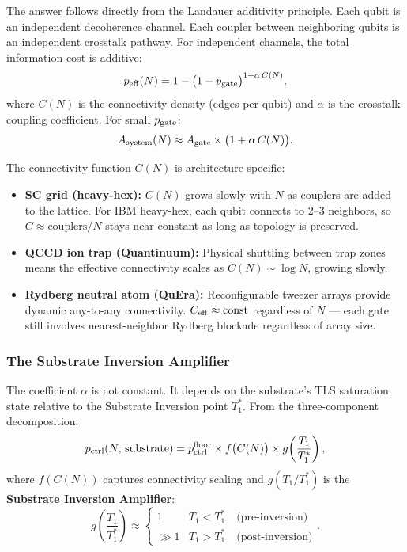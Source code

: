 \documentclass[12pt,a4paper]{article}
\begin{document}
The answer follows directly from the Landauer additivity principle. Each qubit
is an independent decoherence channel. Each coupler between neighboring qubits
is an independent crosstalk pathway. For independent channels, the total
information cost is additive:
\begin{equation}
p_{\rm eff}(N) = 1 - \bigl(1 - p_{\rm gate}\bigr)^{1 + \alpha\, C(N)},
\end{equation}
where $C(N)$ is the connectivity density (edges per qubit) and $\alpha$ is
the crosstalk coupling coefficient. For small $p_{\rm gate}$:
\begin{equation}
A_{\rm system}(N) \approx A_{\rm gate} \times \bigl(1 + \alpha\, C(N)\bigr).
\label{eq:scaling_law}
\end{equation}

The connectivity function $C(N)$ is architecture-specific:
\begin{itemize}
\item \textbf{SC grid (heavy-hex):} $C(N)$ grows slowly with $N$ as couplers
are added to the lattice. For IBM heavy-hex, each qubit connects to 2--3
neighbors, so $C \approx \text{couplers}/N$ stays near constant as long as
topology is preserved.
\item \textbf{QCCD ion trap (Quantinuum):} Physical shuttling between trap
zones means the effective connectivity scales as $C(N) \sim \log N$, growing
slowly.
\item \textbf{Rydberg neutral atom (QuEra):} Reconfigurable tweezer arrays
provide dynamic any-to-any connectivity. $C_{\rm eff} \approx \text{const}$
regardless of $N$ --- each gate still involves nearest-neighbor Rydberg
blockade regardless of array size.
\end{itemize}

\subsubsection{The Substrate Inversion Amplifier}

The coefficient $\alpha$ is not constant. It depends on the substrate's TLS
saturation state relative to the Substrate Inversion point $T_1^*$. From the
three-component decomposition:
\begin{equation}
p_{\rm ctrl}(N,\, \text{substrate}) = p_{\rm ctrl}^{\rm floor} \times
f\bigl(C(N)\bigr) \times g\!\left(\frac{T_1}{T_1^*}\right),
\end{equation}
where $f(C(N))$ captures connectivity scaling and $g(T_1/T_1^*)$ is the
\textbf{Substrate Inversion Amplifier}:
\begin{equation}
g\!\left(\frac{T_1}{T_1^*}\right) \approx \begin{cases}
1 & T_1 < T_1^* \quad\text{(pre-inversion)} \\
\gg 1 & T_1 > T_1^* \quad\text{(post-inversion)}
\end{cases}.
\end{equation}
\end{document}
